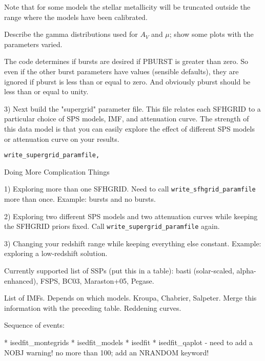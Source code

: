 \documentclass[12pt,preprint]{aastex}
\newcommand{\sfhpro}{{\tt write\_sfhgrid\_paramfile}}
\newcommand{\superpro}{{\tt write\_supergrid\_paramfile}}
\begin{document}
Note that for some models the stellar metallicity will be truncated
outside the range where the models have been calibrated.

Describe the gamma distributions used for $A_V$ and $\mu$; show some
plots with the parameters varied.

The code determines if bursts are desired if PBURST is greater than
zero.  So even if the other burst parameters have values (sensible
defaults), they are ignored if pburst is less than or equal to zero.
And obviously pburst should be less than or equal to unity.
  

3) Next build the "supergrid" parameter file.  This file relates each
SFHGRID to a particular choice of SPS models, IMF, and attenuation
curve.  The strength of this data model is that you can easily explore
the effect of different SPS models or attenuation curve on your
results.

\begin{verbatim}
write_supergrid_paramfile, 
\end{verbatim}


%   
%   


Doing More Complication Things

1) Exploring more than one SFHGRID.  Need to call \sfhpro{} more than
once.  Example: bursts and no bursts.

2) Exploring two different SPS models and two attenuation curves while
keeping the SFHGRID priors fixed.  Call \superpro{} again.

3) Changing your redshift range while keeping everything else
constant.  Example: exploring a low-redshift solution.

Currently supported list of SSPs (put this in a table): basti
(solar-scaled, alpha-enhanced), FSPS, BC03, Maraston+05, Pegase. 

List of IMFs.  Depends on which models.  Kroupa, Chabrier,
Salpeter. Merge this information with the preceding table.   Reddening
curves.  



Sequence of events:

* isedfit_montegrids
* isedfit_models
* isedfit
* isedfit_qaplot - need to add a NOBJ warning!  no more than 100; add
  an NRANDOM keyword!
\end{document}

